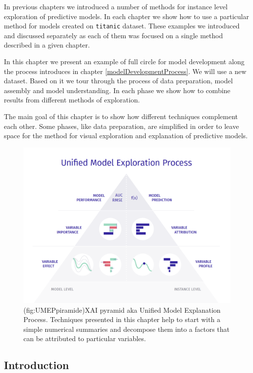 \documentclass[12pt,]{krantz}
\begin{document}
In previous chapters we introduced a number of methods for instance level exploration of predictive models. In each chapter we show how to use a particular method for models created on \texttt{titanic} dataset. These examples we introduced and discussed separately as each of them was focused on a single method described in a given chapter.

In this chapter we present an example of full circle for model development along the process introduces in chapter \ref{modelDevelopmentProcess}. We will use a new dataset. Based on it we tour through the process of data preparation, model assembly and model understanding. In each phase we show how to combine results from different methods of exploration.

The main goal of this chapter is to show how different techniques complement each other. Some phases, like data preparation, are simplified in order to leave space for the method for visual exploration and explanation of predictive models.

\begin{figure}

{\centering \includegraphics[width=0.75\linewidth]{figure/UMEPpiramide} 

}

\caption{(fig:UMEPpiramide)XAI pyramid aka Unified Model Explanation Process. Techniques presented in this chapter help to start with a simple numerical summaries and decompose them into a factors that can be attributed to particular variables.}\label{fig:UMEPpiramide}
\end{figure}

\hypertarget{introduction-1}{%
\subsection{Introduction}\label{introduction-1}}
\end{document}
